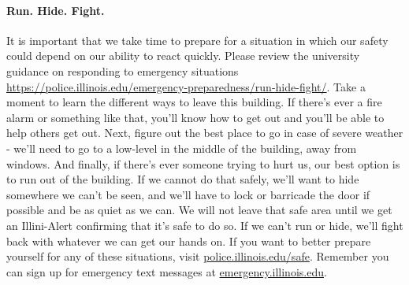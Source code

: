 \documentclass[11pt]{article}
\begin{document}
\paragraph{Run. Hide. Fight.}
It is important that we take time to prepare for a situation in which our 
safety could depend on our ability to react quickly. Please review the 
university guidance on responding to emergency situations 
\url{https://police.illinois.edu/emergency-preparedness/run-hide-fight/}.
Take a moment to learn the different ways to leave
this building. If there’s ever a fire alarm or something like that, you’ll know
how to get out and you’ll be able to help others get out. Next, figure out the
best place to go in case of severe weather - we’ll need to go to a low-level in
the middle of the building, away from windows. And finally, if there’s ever
someone trying to hurt us, our best option is to run out of the building. If we
cannot do that safely, we’ll want to hide somewhere we can’t be seen, and we’ll
have to lock or barricade the door if possible and be as quiet as we can. We
will not leave that safe area until we get an Illini-Alert confirming that it’s
safe to do so. If we can’t run or hide, we’ll fight back with whatever we can
get our hands on. If you want to better prepare yourself for any of these
situations, visit \url{police.illinois.edu/safe}. Remember you can sign up for
emergency text messages at \url{emergency.illinois.edu}.
\end{document}
